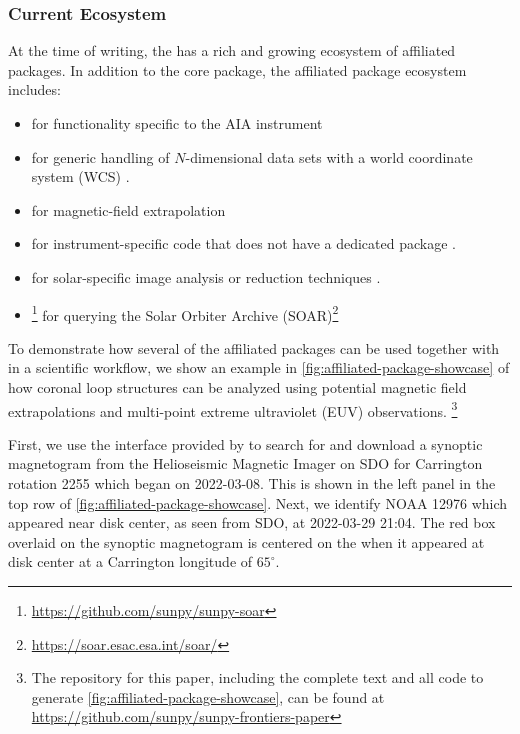 \subsubsection{Current Ecosystem}
\label{sssec:current-ecosystem}

At the time of writing, the \sunpyproj has a rich and growing ecosystem of affiliated packages.
In addition to the \sunpypkg core package, the affiliated package ecosystem includes:

\begin{itemize}
    \item \aiapypkg for functionality specific to the AIA instrument \citep{barnes_aiapy_2020}
    \item {} for generic handling of $N$-dimensional data sets with a world coordinate system (WCS) \citep{danryanirish_2021_5715161}.
    \item {} for magnetic-field extrapolation \citep{stansby_pfsspy_2020}
    \item {} for instrument-specific code that does not have a dedicated package \citep{danryanirish_2022_7190661}.
    \item {} for solar-specific image analysis or reduction techniques \citep{nabil_freij_2022_6578722}.
    \item {}\footnote{\url{https://github.com/sunpy/sunpy-soar}} for querying the Solar Orbiter Archive (SOAR)\footnote{\url{https://soar.esac.esa.int/soar/}}
\end{itemize}

To demonstrate how several of the affiliated packages can be used together with \sunpypkg in a scientific workflow, we show an example in \autoref{fig:affiliated-package-showcase} of how coronal loop structures can be analyzed using potential magnetic field extrapolations and multi-point extreme ultraviolet (EUV) observations.
\footnote{The \github repository for this paper, including the complete text and all code to generate \autoref{fig:affiliated-package-showcase}, can be found at \url{https://github.com/sunpy/sunpy-frontiers-paper}}

First, we use the \Fido interface provided by \sunpypkg to search for and download a synoptic magnetogram from the Helioseismic Magnetic Imager \citep[HMI,][]{scherrer_helioseismic_2012} on SDO for Carrington rotation 2255 which began on 2022-03-08.
This is shown in the left panel in the top row of \autoref{fig:affiliated-package-showcase}.
Next, we identify \AR NOAA 12976 which appeared near disk center, as seen from SDO, at 2022-03-29 21:04.
The red box overlaid on the synoptic magnetogram is centered on the \AR when it appeared at disk center at a Carrington longitude of $65^\circ$.

